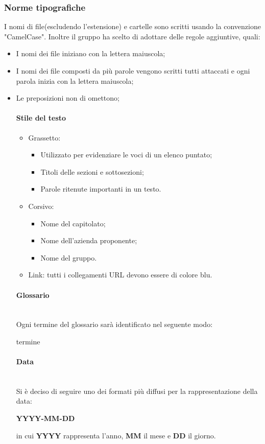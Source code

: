\subsubsection{Norme tipografiche}
I nomi di file(escludendo l'estensione) e cartelle sono scritti usando la convenzione "CamelCase". Inoltre il gruppo \Gruppo ha scelto di adottare delle regole aggiuntive, quali:
\begin{itemize}
\item I nomi dei file iniziano con la lettera maiuscola;
\item I nomi dei file composti da più parole vengono scritti tutti attaccati e ogni parola inizia con la lettera maiuscola;
\item Le preposizioni non di omettono;

\paragraph{Stile del testo}\mbox{}
\begin{itemize}
\item Grassetto:
\begin{itemize}
\item Utilizzato per evidenziare le voci di un elenco puntato;
\item Titoli delle sezioni e sottosezioni;
\item Parole ritenute importanti in un testo.
\end{itemize}
\item Corsivo:
\begin{itemize}
\item Nome del capitolato;
\item Nome dell'azienda proponente;
\item Nome del gruppo.
\end{itemize}
\item Link: tutti i collegamenti URL devono essere di colore blu.
\end{itemize}

\paragraph{Glossario}\mbox{} \\
Ogni termine del glossario sarà identificato nel seguente modo:
\begin{center}
termine
\end{center}

\paragraph{Data}\mbox{} \\
Si è deciso di seguire uno dei formati più diffusi per la rappresentazione della data:
\begin{center}
\textbf{YYYY-MM-DD}
\end{center}
in cui \textbf{YYYY} rappresenta l'anno, \textbf{MM} il mese e \textbf{DD} il giorno.


\end{itemize}
